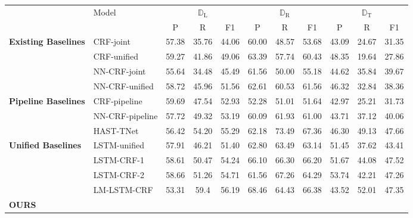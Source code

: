 \documentclass[letterpaper]{article} %
\begin{document}
\begin{table}[]
    \centering
    \begin{tabular}{ll|ccc|ccc|ccc}
    \Xhline{3\arrayrulewidth}
        & \multirow{2}{*}{Model} & \multicolumn{3}{c|}{$\mathbb{D}_{\text{L}}$} & \multicolumn{3}{c|}{$\mathbb{D}_{\text{R}}$} & \multicolumn{3}{c}{$\mathbb{D}_{\text{T}}$}\\ \cline{3-11}
        & & P & R & F1 & P & R & F1 & P & R & F1 \\ \hline \hline
        \multirow{4}{*}{\textbf{Existing Baselines}} & CRF-joint & 57.38 & 35.76 & 44.06 & 60.00 & 48.57 & 53.68 & 43.09 & 24.67 & 31.35 \\
        & CRF-unified & 59.27 & 41.86 & 49.06 & 63.39 & 57.74 & 60.43 & 48.35 & 19.64 & 27.86 \\
        & NN-CRF-joint & 55.64 & 34.48 & 45.49 & 61.56 & 50.00 & 55.18 & 44.62 & 35.84 & 39.67 \\
        & NN-CRF-unified & 58.72 & 45.96 & 51.56 & 62.61 & 60.53 & 61.56 & 46.32 & 32.84 & 38.36 \\ \hline
        \multirow{3}{*}{\textbf{Pipeline Baselines}} & CRF-pipeline & 59.69 & 47.54 & 52.93 & 52.28 & 51.01 & 51.64 & 42.97 & 25.21 & 31.73 \\
        & NN-CRF-pipeline & 57.72 & 49.32 & 53.19 & 60.09 & 61.93 & 61.00 & 43.71 & 37.12 & 40.06 \\
        & HAST-TNet & 56.42 & 54.20 & 55.29 & 62.18 & 73.49 & 67.36 & 46.30 & 49.13 & 47.66 \\ \hline
        \multirow{4}{*}{\textbf{Unified Baselines}} & LSTM-unified & 57.91 & 46.21 & 51.40 & 62.80 & 63.49 & 63.14 & 51.45 & 37.62 & 43.41 \\
        &LSTM-CRF-1 & 58.61 & 50.47 & 54.24 & 66.10 & 66.30 & 66.20 & 51.67 & 44.08 & 47.52 \\
        & LSTM-CRF-2 & 58.66 & 51.26 & 54.71 & 61.56 & 67.26 & 64.29 & 53.74 & 42.21 & 47.26 \\
        & LM-LSTM-CRF & 53.31 & 59.4 & 56.19 & 68.46 & 64.43 & 66.38 & 43.52 & 52.01 & 47.35 \\ \hline
        \multirow{5}{*}{\textbf{OURS}}

\end{tabular}
\end{table}
\end{document}
